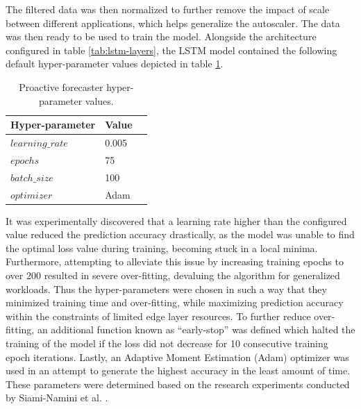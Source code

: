 The filtered data was then normalized to further remove the impact of scale between different applications, which helps generalize the autoscaler. The data was then ready to be used to train the model. Alongside the architecture configured in table \ref{tab:lstm-layers}, the LSTM model contained the following default hyper-parameter values depicted in table \ref{tab:lstm-params}.

\begin{table}
    \caption{Proactive forecaster hyper-parameter values.}\label{tab:lstm-params}
    \centering
    \begin{tabular}{|l|l|l|}
        \hline
        Hyper-parameter & Value\\
        \hline
        $learning\_rate$ & 0.005\\
        $epochs$         & 75\\
        $batch\_size$    & 100\\
        $optimizer$      & Adam\\
        \hline
    \end{tabular}
\end{table}

 It was experimentally discovered that a learning rate higher than the configured value reduced the prediction accuracy drastically, as the model was unable to find the optimal loss value during training, becoming stuck in a local minima. Furthermore, attempting to alleviate this issue by increasing training epochs to over 200 resulted in severe over-fitting, devaluing the algorithm for generalized workloads. Thus the hyper-parameters were chosen in such a way that they minimized training time and over-fitting, while maximizing prediction accuracy within the constraints of limited edge layer resources. To further reduce over-fitting, an additional function known as ``early-stop'' was defined which halted the training of the model if the loss did not decrease for 10 consecutive training epoch iterations. Lastly, an Adaptive Moment Estimation (Adam) optimizer \cite{diederik2014adam} was used in an attempt to generate the highest accuracy in the least amount of time. These parameters were determined based on the research experiments conducted by Siami-Namini et al. \cite{siami2018comparison}.\par

\begin{center}
    \label{fig:loss-mse-training}
    \qquad
\end{center}

